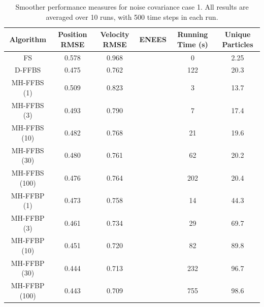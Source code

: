\documentclass[10pt,twocolumn,twoside]{IEEEtran}
\begin{document}
\begin{table}[!t]%
\renewcommand{\arraystretch}{1.3}
\caption{Smoother performance measures for noise covariance case 1. All results are averaged over 10 runs, with 500 time steps in each run.}
\label{tab:case1_performance}
{\scriptsize
\centering
\begin{tabular}{|c||c|c|c|c|c|}
\hline
Algorithm & \begin{minipage}[c]{0.9cm} Position RMSE \end{minipage} & \begin{minipage}[c]{0.9cm}  Velocity RMSE \end{minipage} & \begin{minipage}[c]{0.9cm}  ENEES \end{minipage} & \begin{minipage}[c]{0.9cm}  Running Time (s) \end{minipage} & \begin{minipage}[c]{0.9cm}  Unique Particles \end{minipage} \\
\hline
FS              & 0.578 & 0.968 &  & 0 & 2.25 \\
D-FFBS          & 0.475 & 0.762 &  & 122 & 20.3 \\
\hline
MH-FFBS (1)    & 0.509 & 0.823 &  & 3 & 13.7  \\
MH-FFBS (3)    & 0.493 & 0.790 &  & 7 & 17.4  \\
MH-FFBS (10)   & 0.482 & 0.768 &  & 21 & 19.6 \\
MH-FFBS (30)   & 0.480 & 0.761 &  & 62 & 20.2 \\
MH-FFBS (100)  & 0.476 & 0.764 &  & 202 & 20.4  \\
\hline
MH-FFBP (1)    & 0.473 & 0.758 &  & 14 & 44.3 \\
MH-FFBP (3)    & 0.461 & 0.734 &  & 29 & 69.7 \\
MH-FFBP (10)   & 0.451 & 0.720 &  & 82 & 89.8 \\
MH-FFBP (30)   & 0.444 & 0.713 &  & 232 & 96.7 \\
MH-FFBP (100)  & 0.443 & 0.709 &  & 755 & 98.6 \\
\hline
\end{tabular}
}
\end{table}
\end{document}
